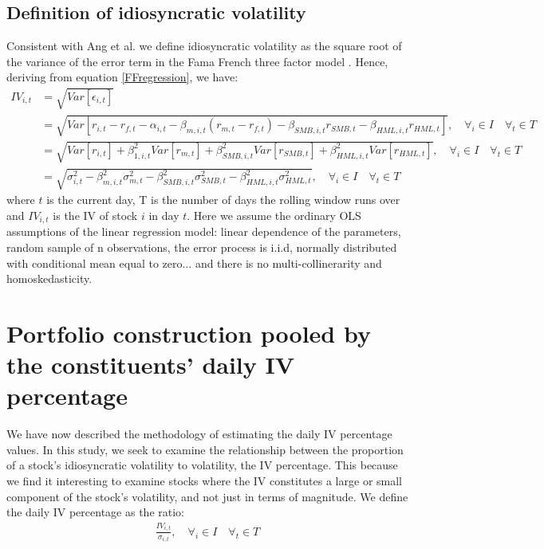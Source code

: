 \subsection{Definition of idiosyncratic volatility}
Consistent with Ang et al. \cite{angetal06} we define idiosyncratic volatility as the square root of the variance of the error term in the Fama French three factor model \cite{famafrench}. Hence, deriving from equation \ref{FFregression}, we have:
 \begin{align}
 IV_{i,t} &= \sqrt{Var[\epsilon_{i,t}]} \\
  &= \sqrt{Var[r_{i,t} - r_{f,t}- \alpha_{i,t}-\beta_{m,i,t}(r_{m,t} - r_{f,t}) - \beta_{SMB,i,t}r_{SMB,t} - \beta_{HML,i,t}r_{HML,t}]},  \quad  \forall_i \in I \quad  \forall_t \in T \\
 &= \sqrt{Var[r_{i,t}]+\beta_{1,i,t}^2Var[r_{m,t}]+\beta_{SMB,i,t}^2Var[r_{SMB,t}]+\beta_{HML,i,t}^2Var[r_{HML,t}]}, \quad  \forall_i \in I \quad  \forall_t \in T \\ 
 &= \sqrt{\sigma_{i,t}^2 - \beta^2_{m,i,t} \sigma_{m,t}^{2}- \beta^2_{SMB,i,t} \sigma_{SMB,t}^{2}- \beta^2_{HML,i,t} \sigma_{HML,t}^{2}}, \quad  \forall_i \in I \quad  \forall_t \in T
 \end{align}
where $t$ is the current day, T is the number of days the rolling window runs over and $IV_{i,t}$ is the IV of stock $i$ in day $t$. Here we assume the ordinary OLS assumptions of the linear regression model: linear dependence of the parameters, random sample of n observations, the error process is i.i.d, normally distributed with conditional mean equal to zero... and there is no multi-collinerarity and homoskedasticity. 

\section{Portfolio construction pooled by the constituents' daily IV percentage}
We have now described the methodology of estimating the daily IV percentage values. In this study, we seek to examine the relationship between the proportion of a stock's idiosyncratic volatility to volatility, the IV percentage. This because we find it interesting to examine stocks where the IV constitutes a large or small component of the stock's volatility, and not just in terms of magnitude. We define the daily IV percentage as the ratio:
\begin{align}
    \frac{IV_{i,t}}{\sigma_{i,t}}, \quad  \forall_i \in I \quad  \forall_t \in T
\end{align}

